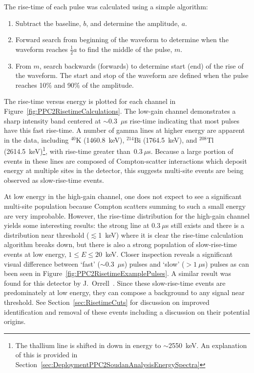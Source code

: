			
	The rise-time of each pulse was calculated using a simple algorithm: 
				\begin{enumerate}
					\item Subtract the baseline, $b$, and determine the amplitude, $a$.
					\item Forward search from beginning of the waveform to determine when the waveform reaches 
					$\frac{1}{2}a$ to find the middle of the pulse, $m$.
					\item From $m$, search backwards (forwards) to determine start (end) of the rise of the waveform.  
					The start and stop of the waveform are defined when the pulse reaches 10\% and 90\% of the amplitude.
				\end{enumerate}
The rise-time versus energy is plotted for each channel in Figure~\ref{fig:PPC2RisetimeCalculations}.  The low-gain channel demonstrates a sharp intensity band centered at $\sim$0.3~$\mu$s rise-time indicating that most pulses have this fast rise-time.  A number of gamma lines at higher energy are apparent in the data, including $^{40}$K (1460.8~keV), $^{214}$Bi (1764.5~keV), and $^{208}$Tl (2614.5~keV)\footnote{The thallium line is shifted in down in energy to $\sim$2550~keV.  An explanation of this is provided in Section~\ref{sec:DeploymentPPC2SoudanAnalysisEnergySpectra}}, with rise-time greater than~$0.3~\mu$s.  Because a large portion of events in these lines are composed of Compton-scatter interactions which deposit energy at multiple sites in the detector, this suggests multi-site events are being observed as slow-rise-time events.  
	
At low energy in the high-gain channel, one does not expect to see a significant multi-site population because Compton scatters summing to such a small energy are very improbable.  However, the rise-time distribution for the high-gain channel yields some interesting results: the strong line at $0.3~\mu$s still exists and there is a distribution near threshold ($\lesssim$1~keV) where it is clear the rise-time calculation algorithm breaks down, but there is also a strong population of slow-rise-time events at low energy, $1\leq E \leq20$~keV.  Closer inspection reveals a significant visual difference between `fast' ($\sim$0.3~$\mu$s) pulses and `slow' ($>1~\mu$s) pulses as can been seen in Figure~\ref{fig:PPC2RisetimeExamplePulses}.  A similar result was found for this detector by J.~Orrell~\cite{Orr2008a}.  Since these slow-rise-time events are predominately at low energy, they can compose a background to any signal near threshold.  See Section~\ref{sec:RisetimeCuts} for discussion on improved identification and removal of these events including a discussion on their potential origins.
	

